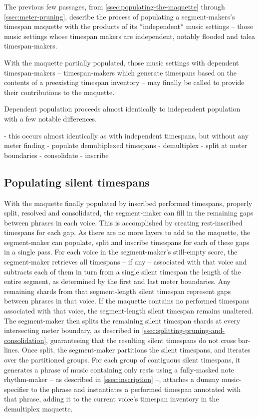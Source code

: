 The previous few passages, from \autoref{ssec:populating-the-maquette} through
\autoref*{ssec:meter-pruning}, describe the process of populating a
segment-makers's timespan maquette with the products of its *independent* music
settings -- those music settings whose timespan makers are independent, notably
flooded and talea timespan-makers.

With the maquette partially populated, those music settings with dependent
timespan-makers -- timespan-makers which generate timespans based on the
contents of a preexisting timespan inventory -- may finally be called to
provide their contributions to the maquette.

Dependent population proceeds almost identically to independent population with
a few notable differences.

\begin{markdown}
-   this occurs almost identically as with independent timespans,
    but without any meter finding
-   populate demultiplexed timespans
-   demultiplex
-   split at meter boundaries
-   consolidate
-   inscribe
\end{markdown}

\subsection{Populating silent timespans}
\label{ssec:populating-silent-timespans}

With the maquette finally populated by inscribed performed timespans, properly
split, resolved and consolidated, the segment-maker can fill in the remaining
gaps between phrases in each voice. This is accomplished by creating
rest-inscribed timespans for each gap. As there are no more layers to add to
the maquette, the segment-maker can populate, split and inscribe timespans for
each of these gaps in a single pass. For each voice in the segment-maker's
still-empty score, the segment-maker retrieves all timespans -- if any --
associated with that voice and subtracts each of them in turn from a single
silent timespan the length of the entire segment, as determined by the first
and last meter boundaries. Any remaining shards from that segment-length silent
timespan represent gaps between phrases in that voice. If the maquette contains
no performed timespans associated with that voice, the segment-length silent
timespan remains unaltered. The segment-maker then splits the remaining silent
timespan shards at every intersecting meter boundary, as described in
\autoref{ssec:splitting-pruning-and-consolidation}, guaranteeing that the
resulting silent timespans do not cross bar-lines. Once split, the
segment-maker partitions the silent timespans, and iterates over the
partitioned groups. For each group of contiguous silent timespans, it generates
a phrase of music containing only rests using a fully-masked note rhythm-maker
-- as described in \autoref{ssec:inscription} --, attaches a dummy
music-specifier to the phrase and instantiates a performed timespan annotated
with that phrase, adding it to the current voice's timespan inventory in the
demultiplex maquette.

